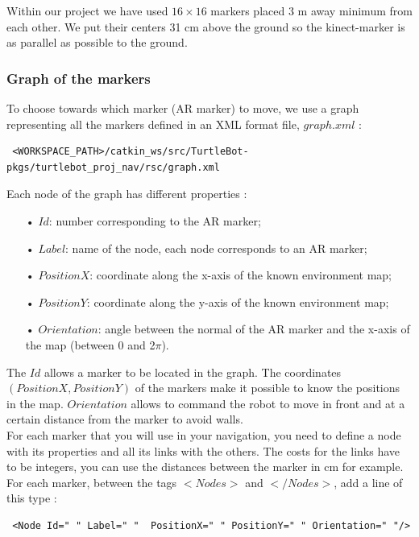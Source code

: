 \documentclass[10pt,a4paper]{article}
\begin{document}
Within our project we have used  $16 \times 16$ markers placed 3 m away minimum from each other. We put their centers 31 cm above the ground so the kinect-marker is as parallel as possible to the ground.

\subsubsection{Graph of the markers}
\label{sec:graphOfTheMarkers}

To choose towards which marker (AR marker) to move, we use a graph representing all the markers defined in an XML format file, $graph.xml$ :

\begin{verbatim} <WORKSPACE_PATH>/catkin_ws/src/TurtleBot-pkgs/turtlebot_proj_nav/rsc/graph.xml\end{verbatim}

Each node of the graph has different properties :

\begin{itemize}
\item[•] $Id$: number corresponding to the AR marker;
\item[•] $Label$: name of the node, each node corresponds to an AR marker;
\item[•] $PositionX$: coordinate along the x-axis of the known environment map;
\item[•] $PositionY$: coordinate along the y-axis of the known environment map;
\item[•] $Orientation$: angle between the normal of the AR marker and the x-axis of the map (between 0 and 2$\pi$).
\end{itemize}

The $Id$ allows a marker to be located in the graph. The coordinates $(PositionX,PositionY)$ of the markers make it possible to know the positions in the map. $Orientation$ allows to command the robot to move in front and at a certain distance from the marker to avoid walls.\\

For each marker that you will use in your navigation, you need to define a node with its properties and all its links with the others. The costs for the links have to be integers, you can use the distances between the marker in cm for example. \\

For each marker, between the tags $<Nodes>$ and $</Nodes>$, add a line of this type : 

\begin{verbatim} <Node Id=" " Label=" "  PositionX=" " PositionY=" " Orientation=" "/> \end{verbatim}
\end{document}
